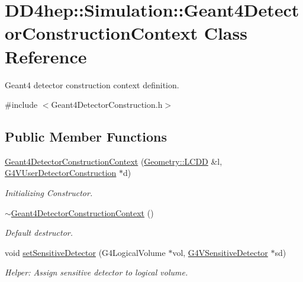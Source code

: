 \hypertarget{class_d_d4hep_1_1_simulation_1_1_geant4_detector_construction_context}{
\section{DD4hep::Simulation::Geant4DetectorConstructionContext Class Reference}
\label{class_d_d4hep_1_1_simulation_1_1_geant4_detector_construction_context}
}


Geant4 detector construction context definition.  


{\ttfamily \#include $<$Geant4DetectorConstruction.h$>$}\subsection*{Public Member Functions}
\begin{DoxyCompactItemize}
\item 
\hyperlink{class_d_d4hep_1_1_simulation_1_1_geant4_detector_construction_context_abb7bca1e231bedcaa5247d54dd18adda}{Geant4DetectorConstructionContext} (\hyperlink{class_d_d4hep_1_1_geometry_1_1_l_c_d_d}{Geometry::LCDD} \&l, \hyperlink{class_g4_v_user_detector_construction}{G4VUserDetectorConstruction} $\ast$d)
\begin{DoxyCompactList}\small\item\em Initializing Constructor. \item\end{DoxyCompactList}\item 
\hyperlink{class_d_d4hep_1_1_simulation_1_1_geant4_detector_construction_context_a4077c4e7962225ebbaf08a9fb2814cb9}{$\sim$Geant4DetectorConstructionContext} ()
\begin{DoxyCompactList}\small\item\em Default destructor. \item\end{DoxyCompactList}\item 
void \hyperlink{class_d_d4hep_1_1_simulation_1_1_geant4_detector_construction_context_aa9715544debd86d973cf7c17c3ee0f7d}{setSensitiveDetector} (G4LogicalVolume $\ast$vol, \hyperlink{class_g4_v_sensitive_detector}{G4VSensitiveDetector} $\ast$sd)
\begin{DoxyCompactList}\small\item\em Helper: Assign sensitive detector to logical volume. \item\end{DoxyCompactList}\end{DoxyCompactItemize}
